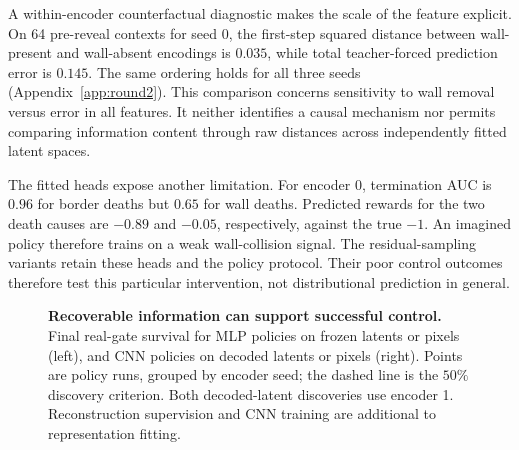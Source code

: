 A within-encoder counterfactual diagnostic makes the scale of the feature explicit. On 64 pre-reveal
contexts for seed 0, the first-step squared distance between wall-present and wall-absent encodings
is $0.035$, while total teacher-forced prediction error is $0.145$. The same ordering holds for all
three seeds (Appendix~\ref{app:round2}). This comparison concerns sensitivity to wall removal versus
error in all features. It neither identifies a causal mechanism nor permits comparing information
content through raw distances across independently fitted latent spaces.

The fitted heads expose another limitation. For encoder 0, termination AUC is $0.96$ for border
deaths but $0.65$ for wall deaths. Predicted rewards for the two death causes are $-0.89$ and $-0.05$,
respectively, against the true $-1$. An imagined policy therefore trains on a weak wall-collision
signal. The residual-sampling variants retain these heads and the policy protocol. Their poor control
outcomes therefore test this particular intervention, not distributional prediction in general.

\begin{figure}[t]
\centering
{}
\caption{\textbf{Recoverable information can support successful control.} Final real-gate survival
for MLP policies on frozen latents or pixels (left), and CNN policies on decoded latents or pixels
(right). Points are policy runs, grouped by encoder seed; the dashed line is the $50\%$ discovery criterion. Both decoded-latent discoveries
use encoder 1. Reconstruction supervision and CNN training are additional to representation fitting.}
\label{fig:representation}
\end{figure}
